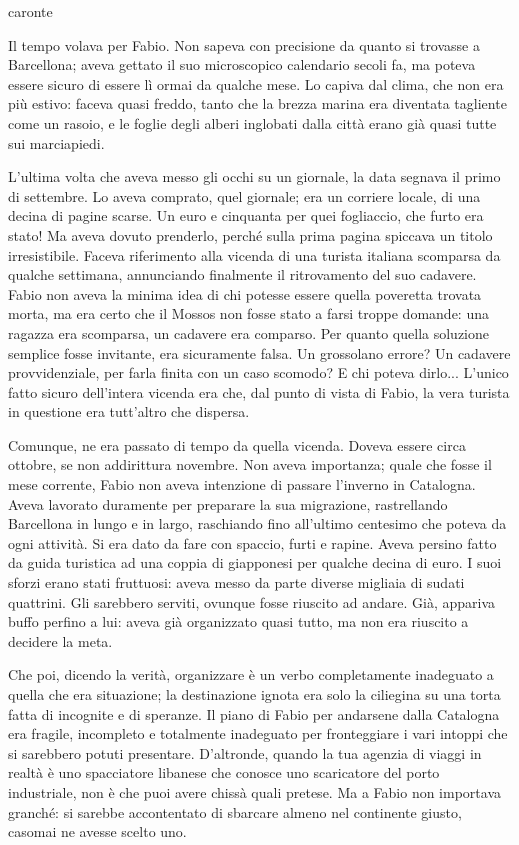 caronte


Il tempo volava per Fabio. Non sapeva con precisione da quanto si trovasse a Barcellona; aveva gettato il suo microscopico calendario secoli fa, ma poteva essere sicuro di essere lì ormai da qualche mese. Lo capiva dal clima, che non era più estivo: faceva quasi freddo, tanto che la brezza marina era diventata tagliente come un rasoio, e le foglie degli alberi inglobati dalla città erano già quasi tutte sui marciapiedi.

L'ultima volta che aveva messo gli occhi su un giornale, la data segnava il primo di settembre. Lo aveva comprato, quel giornale; era un corriere locale, di una decina di pagine scarse. Un euro e cinquanta per quei fogliaccio, che furto era stato! Ma aveva dovuto prenderlo, perché sulla prima pagina spiccava un titolo irresistibile. Faceva riferimento alla vicenda di una turista italiana scomparsa da qualche settimana, annunciando finalmente il ritrovamento del suo cadavere. Fabio non aveva la minima idea di chi potesse essere quella poveretta trovata morta, ma era certo che il Mossos non fosse stato a farsi troppe domande: una ragazza era scomparsa, un cadavere era comparso. Per quanto quella soluzione semplice fosse invitante, era sicuramente falsa. Un grossolano errore? Un cadavere provvidenziale, per farla finita con un caso scomodo? E chi poteva dirlo... L'unico fatto sicuro dell'intera vicenda era che, dal punto di vista di Fabio, la vera turista in questione era tutt'altro che dispersa.

Comunque, ne era passato di tempo da quella vicenda. Doveva essere circa ottobre, se non addirittura novembre. Non aveva importanza; quale che fosse il mese corrente, Fabio non aveva intenzione di passare l'inverno in Catalogna. Aveva lavorato duramente per preparare la sua migrazione, rastrellando Barcellona in lungo e in largo, raschiando fino all'ultimo centesimo che poteva da ogni attività. Si era dato da fare con spaccio, furti e rapine. Aveva persino fatto da guida turistica ad una coppia di giapponesi per qualche decina di euro. I suoi sforzi erano stati fruttuosi: aveva messo da parte diverse migliaia di sudati quattrini. Gli sarebbero serviti, ovunque fosse riuscito ad andare. Già, appariva buffo perfino a lui: aveva già organizzato quasi tutto, ma non era riuscito a decidere la meta.

Che poi, dicendo la verità, organizzare è un verbo completamente inadeguato a quella che era situazione; la destinazione ignota era solo la ciliegina su una torta fatta di incognite e di speranze. Il piano di Fabio per andarsene dalla Catalogna era fragile, incompleto e totalmente inadeguato per fronteggiare i vari intoppi che si sarebbero potuti presentare. D'altronde, quando la tua agenzia di viaggi in realtà è uno spacciatore libanese che conosce uno scaricatore del porto industriale, non è che puoi avere chissà quali pretese. Ma a Fabio non importava granché: si sarebbe accontentato di sbarcare almeno nel continente giusto, casomai ne avesse scelto uno.


